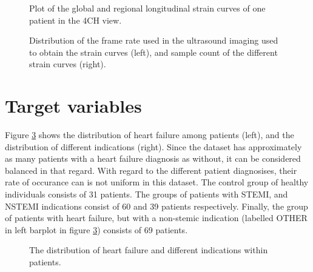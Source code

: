 \begin{figure}[h]
    \centering
    
    \caption{Plot of the global and regional longitudinal strain curves of one patient in the 4CH view.}
    \label{fig:strain_curves}
\end{figure}

\begin{figure}
    \centering
    
    \caption{Distribution of the frame rate used in the ultrasound imaging used to obtain the strain curves (left), and sample count of the different strain curves (right).}
    \label{fig:fr_sample_dist}
\end{figure}

\newpage

\section{Target variables} \label{sec:target}
Figure \ref{fig:hf_ind_dist} shows the distribution of heart failure among patients (left), and the distribution of different indications (right). 
Since the dataset has approximately as many patients with a heart failure diagnosis as without, it can be considered balanced in that regard. 
With regard to the different patient diagnosises, their rate of occurance can is not uniform in this dataset. 
The control group of healthy individuals consists of 31 patients. 
The groups of patients with STEMI, and NSTEMI indications consist of 60 and 39 patients respectively. 
Finally, the group of patients with heart failure, but with a non-stemic indication (labelled OTHER in left barplot in figure \ref{fig:hf_ind_dist}) consists of 69 patients. \bigskip

\begin{figure}[h]
    \centering
    
    \caption{The distribution of heart failure and different indications within patients.}
    \label{fig:hf_ind_dist}
\end{figure}


